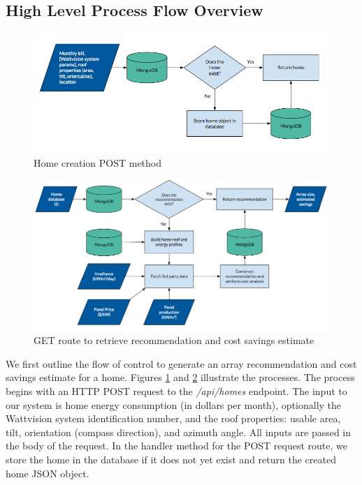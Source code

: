 \documentclass[pageno]{jpaper}
\begin{document}
\bigskip

\subsection{High Level Process Flow Overview}

\begin{figure}[h]
\begin{center}
\includegraphics[width= \textwidth]{POST}
\caption{Home creation POST method}
\label{fig:post}
\end{center}
\end{figure}

\begin{figure}[h]
\begin{center}
\includegraphics[width=\textwidth] {GET}
\caption{GET route to retrieve recommendation and cost savings estimate}
\label{fig:get}
\end{center}
\end{figure}

We first outline the flow of control to generate an array recommendation and cost savings estimate for a home. Figures \ref{fig:post} and \ref{fig:get} illustrate the processes. The process begins with an HTTP POST request to the {\em /api/homes} endpoint. The input to our system is home energy consumption (in dollars per month), optionally the Wattvision system identification number, and the roof properties: usable area, tilt, orientation (compass direction), and azimuth angle. All inputs are passed in the body of the request. In the handler method for the POST request route, we store the home in the database if it does not yet exist and return the created home JSON object. 
\end{document}
